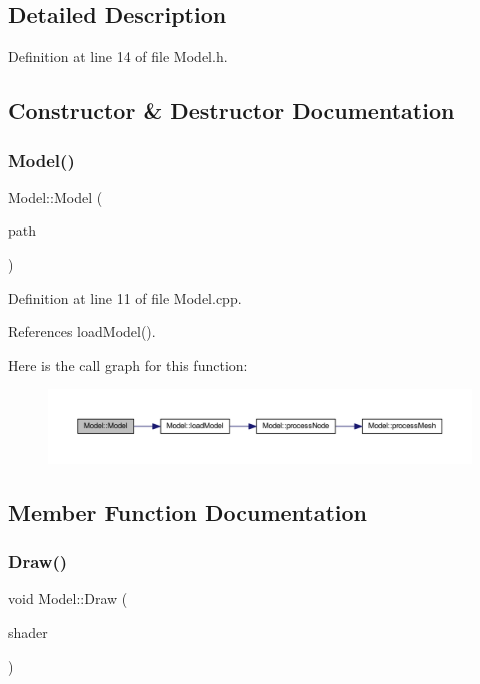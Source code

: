 \subsection{Detailed Description}


Definition at line 14 of file Model.\+h.



\subsection{Constructor \& Destructor Documentation}
\mbox{\label{classModel_a97ced90b9b512521b2e5bdeaeac6b907}} 
\subsubsection{\texorpdfstring{Model()}{Model()}}
{\footnotesize\ttfamily Model\+::\+Model (\begin{DoxyParamCaption}\item[{const G\+Lchar $\ast$}]{path }\end{DoxyParamCaption})}



Definition at line 11 of file Model.\+cpp.



References load\+Model().

Here is the call graph for this function\+:
\nopagebreak
\begin{figure}[H]
\begin{center}
\leavevmode
\includegraphics[width=350pt]{classModel_a97ced90b9b512521b2e5bdeaeac6b907_cgraph}
\end{center}
\end{figure}


\subsection{Member Function Documentation}
\mbox{\label{classModel_a191a00d937b9e911bf4881ea14d79b6c}} 
\subsubsection{\texorpdfstring{Draw()}{Draw()}}
{\footnotesize\ttfamily void Model\+::\+Draw (\begin{DoxyParamCaption}\item[{\mbox{\hyperlink{classShader}{Shader}}}]{shader }\end{DoxyParamCaption})}



